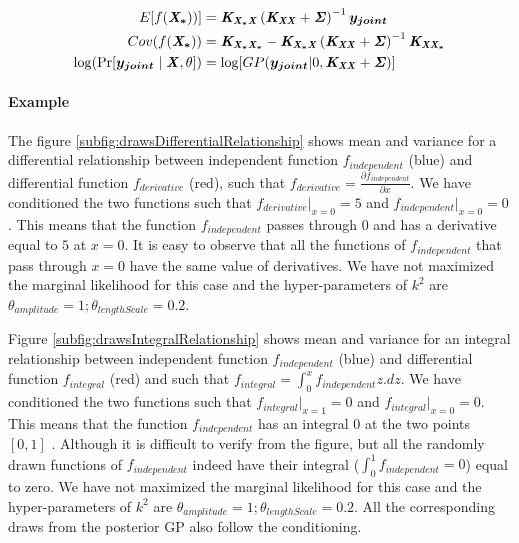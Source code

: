 \begin{align}
  E[f(\bm{\mathit{X_{*}}}))] & = \bm{\mathit{K_{X_{*}X}}}\left ( \bm{\mathit{K_{XX}}} + \bm{\mathit{\Sigma}} \right )^{-1}\boldsymbol{y_{joint}} \label{eq:predictiveMOMeanCh7} \\ 
  Cov(f(\bm{\mathit{X_{*}}})) & = \bm{\mathit{K_{X_{*}X_{*}}}} - \bm{\mathit{K_{X_{*}X}}}\left ( \bm{\mathit{K_{XX}}} + \bm{\mathit{\Sigma}} \right )^{-1} \bm{\mathit{K_{XX_{*}}}} \label{eq:predictiveMOCovarianceCh7} \\
  \log(\Pr[\boldsymbol{y_{joint}} \mid \bm{\mathit{X}}, \theta]) & = \log[GP(\boldsymbol{y_{joint}}| 0, \bm{\mathit{K_{XX}}} + \bm{\mathit{\Sigma}} )] \label{eq:exactMONLMLCh7}
\end{align}

\begin{mdframed}[hidealllines=true,backgroundcolor=lightgray!20]
\paragraph{Example}
The figure \ref{subfig:drawsDifferentialRelationship} shows mean and variance for a differential relationship between independent function \(f_{independent}\) (blue) and differential function \(f_{derivative}\) (red), such that \(f_{derivative} = \frac{\partial f_{independent}}{\partial x}\). We have conditioned the two functions such that \(f_{derivative}|_{x = 0} = 5\) and \(f_{independent}|_{x = 0} = 0\). This means that the function \(f_{independent}\) passes through \(0\) and has a derivative equal to \(5\) at \(x = 0\). It is easy to observe that all the functions of \(f_{independent}\) that pass through $x=0$ have the same value of derivatives.
We have not maximized the marginal likelihood for this case and the hyper-parameters of \(k^2\) are \(\theta_{amplitude} = 1; \theta_{lengthScale} = 0.2\). 

Figure \ref{subfig:drawsIntegralRelationship} shows mean and variance for an integral relationship between independent function \(f_{independent}\) (blue) and differential function \(f_{integral}\) (red) and such that \(f_{integral} = \int_0^x f_{independent}z . dz\). We have conditioned the two functions such that \(f_{integral}|_{x = 1} = 0\) and \(f_{integral}|_{x = 0} = 0\). This means that the function \(f_{independent}\) has an integral \(0\) at the two points \([0, 1]\) . Although it is difficult to verify from the figure, but all the randomly drawn functions of \(f_{independent}\) indeed have their integral ($\int_{0}^{1} f_{independent} = 0 $) equal to zero. We have not maximized the marginal likelihood for this case and the hyper-parameters of \(k^2\) are \(\theta_{amplitude} = 1; \theta_{lengthScale} = 0.2\). All the corresponding draws from the posterior GP also follow the conditioning. 
\end{mdframed}

